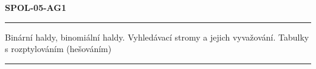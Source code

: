 \documentclass[a4paper,11pt]{article}
\newcommand{\nadpis}{SPOL-05-AG1}
\newcommand{\zadani}{Binární haldy, binomiální haldy. Vyhledávací stromy a jejich vyvažování. Tabulky s rozptylováním (hešováním)}
\begin{document}
\begin{center}
\huge\textbf{\nadpis{}}
\noindent\rule{\textwidth}{0.4pt}
\large{\zadani{}}
\noindent\rule{\textwidth}{0.4pt}
\end{center}


\end{document}
